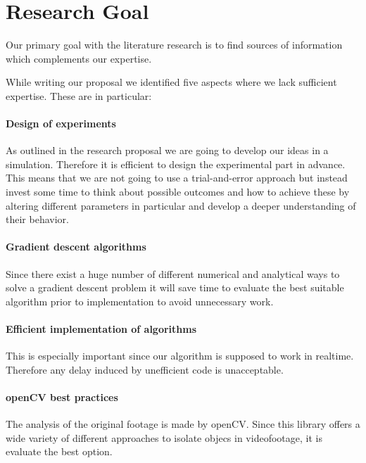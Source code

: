 \documentclass[titlepage, a4paper, 11pt]{scrartcl}
\begin{document}
\section{Research Goal}

Our primary goal with the literature research is to find sources of information which complements our expertise. 

While writing our proposal we identified five aspects where we lack sufficient expertise.
These are in particular:

\paragraph{Design of experiments}

As outlined in the research proposal we are going to develop our ideas in a simulation. Therefore it is efficient to design the experimental part in advance.
This means that we are not going to use a trial-and-error approach but instead invest some time to think about possible outcomes and how to achieve these by 
altering different parameters in particular and develop a deeper understanding of their behavior.

\paragraph{Gradient descent algorithms}

Since there exist a huge number of different numerical and analytical ways to solve a gradient descent problem it will save time to evaluate the best
suitable algorithm prior to implementation to avoid unnecessary work.

\paragraph{Efficient implementation of algorithms}

This is especially important since our algorithm is supposed to work in realtime.
Therefore any delay induced by unefficient code is unacceptable.

\paragraph{openCV best practices}

The analysis of the original footage is made by openCV. Since this library offers a wide variety of different approaches to isolate objecs in videofootage,
it is evaluate the best option.
\end{document}

